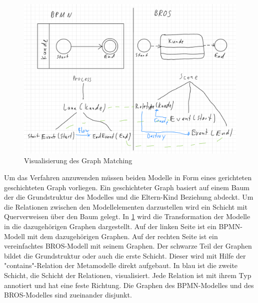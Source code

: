 \begin{figure}
    \includegraphics[width=\textwidth,keepaspectratio]{../images/ModelToGraph.pdf}%
    \caption{Visualisierung des Graph Matching}%
    \label{fig:ModelToGraph}
\end{figure}

Um das Verfahren anzuwenden müssen beiden Modelle in Form eines gerichteten geschichteten Graph vorliegen.
Ein geschichteter Graph basiert auf einem Baum der die Grundstruktur des Modelles und die Eltern-Kind Beziehung abdeckt.
Um die Relationen zwischen den Modellelementen darzustellen wird ein Schicht mit Querverweisen über den Baum gelegt.
In \cref{fig:ModelToGraph} wird die Transformation der Modelle in die dazugehörigen Graphen dargestellt.
Auf der linken Seite ist ein BPMN-Modell mit dem dazugehörigen Graphen. 
Auf der rechten Seite ist ein vereinfachtes BROS-Modell mit seinem Graphen.
Der schwarze Teil der Graphen bildet die Grundstruktur oder auch die erste Schicht.
Dieser wird mit Hilfe der "contains"-Relation der Metamodelle direkt aufgebaut.
In blau ist die zweite Schicht, die Schicht der Relationen, visualisiert.
Jede Relation ist mit ihrem Typ annotiert und hat eine feste Richtung.
Die Graphen des BPMN-Modelles und des BROS-Modelles sind zueinander disjunkt.

